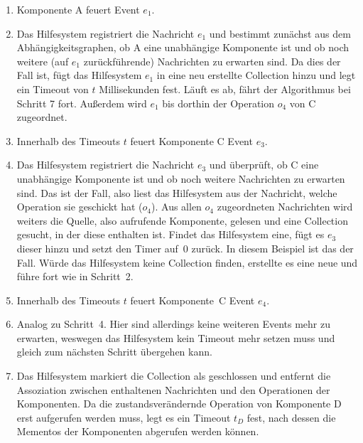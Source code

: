 \documentclass[
	headsepline,
	footsepline,
	fontsize=12pt,
	bibliography=totoc
]{scrbook}
\begin{document}
\begin{enumerate}
	\item Komponente A feuert Event $e_1$.
	\item Das Hilfesystem registriert die Nachricht $e_1$ und bestimmt zunächst aus dem Abhängigkeitsgraphen, ob A eine unabhängige Komponente ist und ob noch weitere (auf $e_1$ zurückführende) Nachrichten zu erwarten sind. Da dies der Fall ist, fügt das Hilfesystem $e_1$ in eine neu erstellte Collection hinzu und legt ein Timeout von $t$ Millisekunden fest. Läuft es ab, fährt der Algorithmus bei Schritt 7 fort. Außerdem wird $e_1$ bis dorthin der Operation $o_4$ von C zugeordnet.
	\item Innerhalb des Timeouts $t$ feuert Komponente C Event $e_3$.
	\item Das Hilfesystem registriert die Nachricht $e_3$ und überprüft, ob C eine unabhängige Komponente ist und ob noch weitere Nachrichten zu erwarten sind. Das ist der Fall, also liest das Hilfesystem aus der Nachricht, welche Operation sie geschickt hat ($o_4$). Aus allen $o_4$ zugeordneten Nachrichten wird weiters die Quelle, also aufrufende Komponente, gelesen und eine Collection gesucht, in der diese enthalten ist. Findet das Hilfesystem eine, fügt es $e_3$ dieser hinzu und setzt den Timer auf~0 zurück. In diesem Beispiel ist das der Fall. Würde das Hilfesystem keine Collection finden, erstellte es eine neue und führe fort wie in Schritt~2.
	\item Innerhalb des Timeouts $t$ feuert Komponente~C Event $e_4$.
	\item Analog zu Schritt~4. Hier sind allerdings keine weiteren Events mehr zu erwarten, weswegen das Hilfesystem kein Timeout mehr setzen muss und gleich zum nächsten Schritt übergehen kann.
	\item Das Hilfesystem markiert die Collection als geschlossen und entfernt die Assoziation zwischen enthaltenen Nachrichten und den Operationen der Komponenten. Da die zustandsverändernde Operation von Komponente D erst aufgerufen werden muss, legt es ein Timeout $t_D$ fest, nach dessen die Mementos der Komponenten abgerufen werden können.
\end{enumerate}

\end{document}
